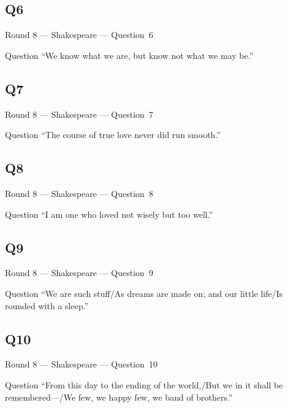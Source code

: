 \documentclass[11pt]{beamer}
\begin{document}
\subsection*{Q6}
\begin{frame}[t]{Round 8 --- Shakespeare --- \mbox{Question 6}}
\vspace{-0.5em}
\begin{block}{Question}
``We know what we are, but know not what we may be.''
\end{block}
\end{frame}
\subsection*{Q7}
\begin{frame}[t]{Round 8 --- Shakespeare --- \mbox{Question 7}}
\vspace{-0.5em}
\begin{block}{Question}
``The course of true love never did run smooth.''
\end{block}
\end{frame}
\subsection*{Q8}
\begin{frame}[t]{Round 8 --- Shakespeare --- \mbox{Question 8}}
\vspace{-0.5em}
\begin{block}{Question}
``I am one who loved not wisely but too well.''
\end{block}
\end{frame}
\subsection*{Q9}
\begin{frame}[t]{Round 8 --- Shakespeare --- \mbox{Question 9}}
\vspace{-0.5em}
\begin{block}{Question}
``We are such stuff/As dreams are made on; and our little life/Is rounded with a sleep.''
\end{block}
\end{frame}
\subsection*{Q10}
\begin{frame}[t]{Round 8 --- Shakespeare --- \mbox{Question 10}}
\vspace{-0.5em}
\begin{block}{Question}
``From this day to the ending of the world,/But we in it shall be remembered---/We few, we happy few, we band of brothers.''
\end{block}
\end{frame}
\end{document}
